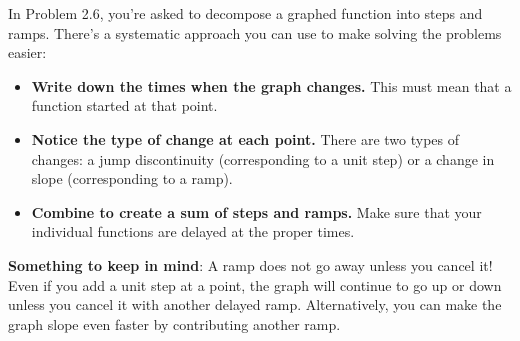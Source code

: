 \documentclass[11pt]{article}
\begin{document}
In Problem 2.6, you're asked to decompose a graphed function into steps and ramps. There's a systematic approach you can use to make solving the problems easier:
\begin{itemize}
\item {\bf Write down the times when the graph changes.} This must mean that a function started at that point.
\item {\bf Notice the type of change at each point.} There are two types of changes: a jump discontinuity (corresponding to a unit step) or a change in slope (corresponding to a ramp).
\item {\bf Combine to create a sum of steps and ramps.} Make sure that your individual functions are delayed at the proper times.
\end{itemize}
{\bf Something to keep in mind}: A ramp does not go away unless you cancel it! Even if you add a unit step at a point, the graph will continue to go up or down unless you cancel it with another delayed ramp. Alternatively, you can make the graph slope even faster by contributing another ramp.
\end{document}
